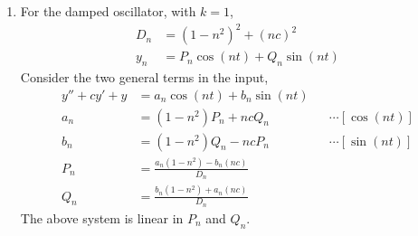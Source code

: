 \begin{enumerate}
    \item For the damped oscillator, with $ k = 1 $,
          \begin{align}
              D_n & = (1 - n^2)^2 + (nc)^2        \\
              y_n & = P_n \cos(nt) + Q_n \sin(nt)
          \end{align}
          Consider the two general terms in the input,
          \begin{align}
              y'' + cy' + y & = a_n \cos(nt) + b_n \sin(nt)             \\
              a_n           & = (1 - n^2)P_n + nc Q_n                 &
                            & \cdots[\cos(nt)]                          \\
              b_n           & = (1 - n^2)Q_n - nc P_n                 &
                            & \cdots[\sin(nt)]                          \\
              P_n           & = \frac{a_n (1 - n^2)  - b_n (nc)}{D_n}   \\
              Q_n           & = \frac{b_n (1 - n^2)  + a_n (nc)}{D_n}
          \end{align}
          The above system is linear in $ P_n $ and $ Q_n $.


\end{enumerate}
